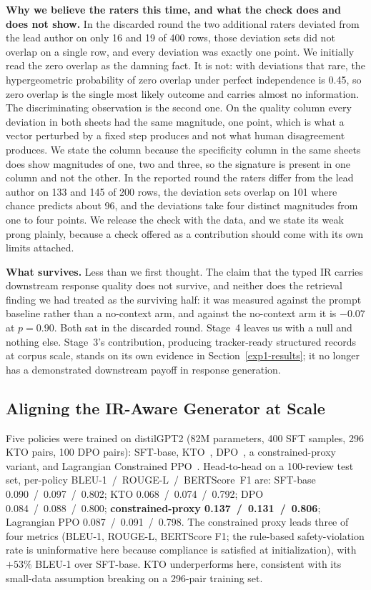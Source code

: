\documentclass[sigconf, anonymous]{acmart}
\begin{document}
\textbf{Why we believe the raters this time, and what the check does and does not show.} In the
discarded round the two additional raters deviated from the lead author on only 16 and 19 of 400
rows, those deviation sets did not overlap on a single row, and every deviation was exactly one
point. We initially read the zero overlap as the damning fact. It is not: with deviations that
rare, the hypergeometric probability of zero overlap under perfect independence is 0.45, so zero
overlap is the single most likely outcome and carries almost no information. The discriminating
observation is the second one. On the quality column every deviation in both sheets had the same magnitude, one point, which is
what a vector perturbed by a fixed step produces and not what human disagreement produces. We
state the column because the specificity column in the same sheets does show magnitudes of one,
two and three, so the signature is present in one column and not the other. In the
reported round the raters differ from the lead author on 133 and 145 of 200 rows, the deviation
sets overlap on 101 where chance predicts about 96, and the deviations take four distinct
magnitudes from one to four points. We release the check with the data, and we state its weak
prong plainly, because a check offered as a contribution should come with its own limits
attached.

\textbf{What survives.} Less than we first thought. The claim that the typed IR carries
downstream response quality does not survive, and neither does the retrieval finding we had
treated as the surviving half: it was measured against the prompt baseline rather than a
no-context arm, and against the no-context arm it is $-0.07$ at $p = 0.90$. Both sat in the
discarded round. Stage~4 leaves us with a null and nothing else. Stage~3's contribution, producing tracker-ready structured records at corpus scale,
stands on its own evidence in Section~\ref{exp1-results}; it no longer has a demonstrated
downstream payoff in response generation.

\subsection{Aligning the IR-Aware Generator at Scale}\label{exp3-results}

  Five policies were trained on distilGPT2 (82M parameters, 400 SFT samples, 296 KTO pairs, 100
  DPO pairs): SFT-base, KTO~\cite{ethayarajh2024kto}, DPO~\cite{rafailov2023direct}, a constrained-proxy
  variant, and Lagrangian Constrained PPO~\cite{schulman2017proximal, dai2024safe}. Head-to-head on a
  100-review test set, per-policy BLEU-1~/~ROUGE-L~/~BERTScore~F1 are: SFT-base
  0.090~/~0.097~/~0.802; KTO 0.068~/~0.074~/~0.792; DPO 0.084~/~0.088~/~0.800;
  \textbf{constrained-proxy 0.137~/~0.131~/~0.806}; Lagrangian PPO 0.087~/~0.091~/~0.798. The
  constrained proxy leads three of four metrics (BLEU-1, ROUGE-L, BERTScore F1; the rule-based
  safety-violation rate is uninformative here because compliance is satisfied at
  initialization), with $+53\%$ BLEU-1 over SFT-base. KTO underperforms here, consistent with
  its small-data assumption breaking on a 296-pair training set.
\end{document}

